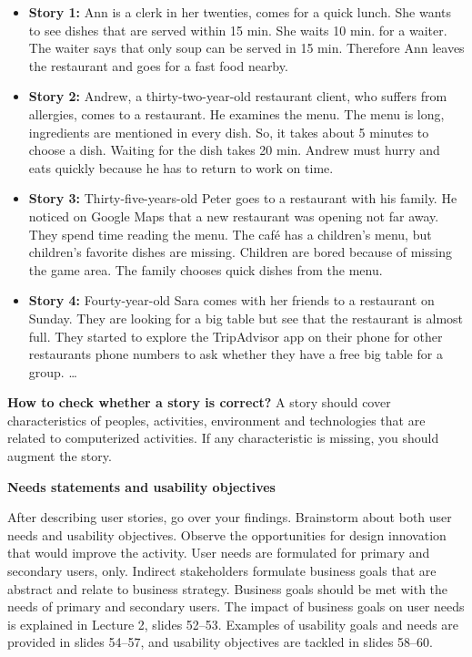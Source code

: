\documentclass[]{VUMIFTemplateClass}
\begin{document}
\begin{itemize}
    \item \textbf{Story 1:} Ann is a clerk in her twenties, comes for a quick lunch. She wants to see dishes that are served within 15 min. She waits 10 min. for a waiter. The waiter says that only soup can be served in 15 min. Therefore Ann leaves the restaurant and goes for a fast food nearby.
    
    \item \textbf{Story 2:} Andrew, a thirty-two-year-old restaurant client, who suffers from allergies, comes to a restaurant. He examines the menu. The menu is long, ingredients are mentioned in every dish. So, it takes about 5 minutes to choose a dish. Waiting for the dish takes 20 min. Andrew must hurry and eats quickly because he has to return to work on time.
    
    \item \textbf{Story 3:} Thirty-five-years-old Peter goes to a restaurant with his family. He noticed on Google Maps that a new restaurant was opening not far away. They spend time reading the menu. The café has a children's menu, but children's favorite dishes are missing. Children are bored because of missing the game area. The family chooses quick dishes from the menu.
    
    \item \textbf{Story 4:} Fourty-year-old Sara comes with her friends to a restaurant on Sunday. They are looking for a big table but see that the restaurant is almost full. They started to explore the TripAdvisor app on their phone for other restaurants phone numbers to ask whether they have a free big table for a group. \ldots
\end{itemize}

\textbf{How to check whether a story is correct?} A story should cover characteristics of peoples, activities, environment and technologies that are related to computerized activities. If any characteristic is missing, you should augment the story.

\textbf{Needs statements and usability objectives}

After describing user stories, go over your findings. Brainstorm about both user needs and usability objectives. Observe the opportunities for design innovation that would improve the activity. User needs are formulated for primary and secondary users, only. Indirect stakeholders formulate business goals that are abstract and relate to business strategy. Business goals should be met with the needs of primary and secondary users. The impact of business goals on user needs is explained in Lecture 2, slides 52–53. Examples of usability goals and needs are provided in slides 54--57, and usability objectives are tackled in slides 58--60.
\end{document}
